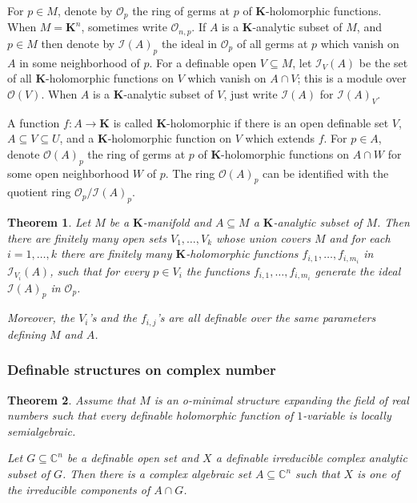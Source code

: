 \documentclass{amsart}
\newtheorem{theorem}{Theorem}[subsection]
\theoremstyle{definition}
\numberwithin{equation}{section}
\begin{document}
For $p\in M$, denote by $\mathcal{O}_p$ the ring of germs at $p$ of $\mathbf{K}$-holomorphic functions.
When $M = \mathbf{K}^n$, sometimes write $\mathcal{O}_{n,p}$.
If $A$ is a $\mathbf{K}$-analytic subset of $M$,
and $p \in M$ then denote by $\mathcal{I}(A)_p$ the ideal in $\mathcal{O}_p$ of all germs at $p$ which vanish on $A$ in some neighborhood of $p$.
For a definable open $V \subseteq M$,
let $\mathcal{I}_V(A)$ be the set of all $\mathbf{K}$-holomorphic functions on $V$ which vanish on $A \cap V$;
this is a module over $\mathcal{O}(V)$.
When $A$ is a $\mathbf{K}$-analytic subset of $V$,
just write $\mathcal{I}(A)$ for $\mathcal{I}(A)_V$.

A function $f: A \to \mathbf{K}$ is called $\mathbf{K}$-holomorphic if there is an open definable set $V$, $A \subseteq V \subseteq U$,
and a $\mathbf{K}$-holomorphic function on $V$ which extends $f$.
For $p \in A$, denote $\mathcal{O}(A)_p$ the ring of germs at $p$ of $\mathbf{K}$-holomorphic functions on $A \cap W$ for some open neighborhood $W$ of $p$.
The ring $\mathcal{O}(A)_p$ can be identified with the quotient ring $\mathcal{O}_p/\mathcal{I}(A)_p$.

\begin{tcolorbox}[title = {Coherence Theorem}]
	\begin{theorem}
		Let $M$ be a $\mathbf{K}$-manifold and $A \subseteq M$ a $\mathbf{K}$-analytic subset of $M$.
		Then there are finitely many open sets $V_1,\dots,V_k$ whose union covers $M$ and for each $i = 1,\dots,k$
		there are finitely many $\mathbf{K}$-holomorphic functions $f_{i,1},\dots,f_{i,m_i}$ in $\mathcal{I}_{V_i} (A)$,
		such that for every $p \in V_i$ the functions $f_{i,1},\dots,f_{i,m_i}$ generate the ideal $\mathcal{I}(A)_p$ in $\mathcal{O}_p$.

		Moreover, the $V_i$'s and the $f_{i,j}$'s are all definable over the same parameters defining $M$ and $A$.
	\end{theorem}
\end{tcolorbox}

\subsubsection{Definable structures on complex number}
\begin{theorem}
	Assume that $M$ is an o-minimal structure expanding the field of real numbers such that every definable holomorphic function of $1$-variable is locally semialgebraic.

	Let $G \subseteq \mathbb{C}^n$ be a definable open set and $X$ a definable irreducible complex analytic subset of $G$.
	Then there is a complex algebraic set $A \subseteq \mathbb{C}^n$ such that $X$ is one of the irreducible components of $A \cap G$.
\end{theorem}
\end{document}
